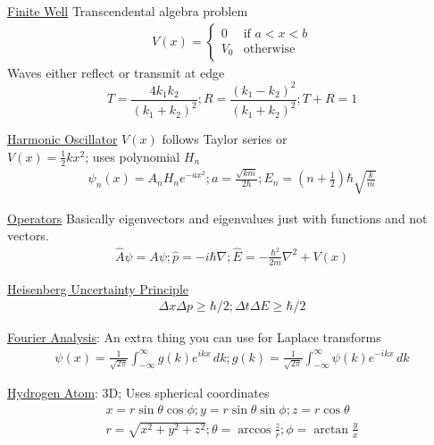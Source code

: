 \documentclass[8pt]{extarticle}
\newcommand{\e}[1]{e^{#1}}
\begin{document}
    \underline{Finite Well} Transcendental algebra problem
    \begin{gather*}
        V(x) = \begin{cases}
            0 & \text{if } a < x < b \\
            V_0 & \text{otherwise}
        \end{cases}
    \end{gather*}
    Waves either reflect or transmit at edge
    \begin{equation*}
        T = \frac{4k_1k_2}{(k_1 + k_2)^2}; 
        R = \frac{(k_1 - k_2)^2}{(k_1 + k_2)^2}; 
        T + R = 1
    \end{equation*}

    \underline{Harmonic Oscillator}
    $V(x)$ follows Taylor series or \\$V(x) = \frac{1}{2}kx^2$; uses polynomial $H_n$
    \begin{gather*}
        \psi_n(x) = A_n H_n \e{-ax^2}; a = \frac{\sqrt{km}}{2\hbar}; E_n = \left( n + \frac{1}{2} \right) \hbar \sqrt{\frac{k}{m}}
    \end{gather*}

    \underline{Operators} Basically eigenvectors and eigenvalues just with functions and not vectors.
    \begin{gather*}
        \hat{A}\psi = A\psi; \hat{p} = -i\hbar\nabla;
        \hat{E} = -\frac{\hbar^2}{2m}\nabla^2 + V(x)
    \end{gather*}

    \underline{Heisenberg Uncertainty Principle}
        \begin{gather*}
            \Delta x \Delta p \geq \hbar / 2;
            \Delta t \Delta E \geq \hbar / 2
        \end{gather*}
    
    \underline{Fourier Analysis}: An extra thing you can use for Laplace transforms
        \begin{gather*}
            \psi(x) = \frac{1}{\sqrt{2\pi}}\int_{-\infty}^{\infty} g(k) \e{ikx}\,dk;
            g(k) = \frac{1}{\sqrt{2\pi}}\int_{-\infty}^{\infty} \psi(k) \e{-ikx}\,dk
        \end{gather*}

    \underline{Hydrogen Atom}:
        3D; Uses spherical coordinates
        \begin{gather*}
            x = r \sin\theta \cos\phi; y = r \sin\theta \sin\phi; z = r \cos\theta\\
            r = \sqrt{x^2 + y^2 + z^2}; \theta = \arccos\frac{z}{r}; \phi = \arctan\frac{y}{x}
        \end{gather*}
\end{document}
